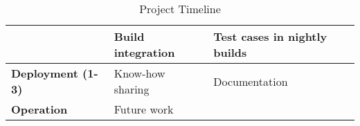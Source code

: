 \begin{table}[]
\begin{tabular}{|l|l|l|}
                                         & Build integration                                                              & Test cases in nightly builds                                                  \\ \hline
    \textbf{Deployment (1-3)}            & Know-how sharing                                                               & Documentation                                                                 \\ \hline
    \textbf{Operation}                   & Future work                                                                    &                                                                               \\ \hline
    \end{tabular}
    
    \caption{Project Timeline}
    \label{Tab:projectTimeline}
\end{table}